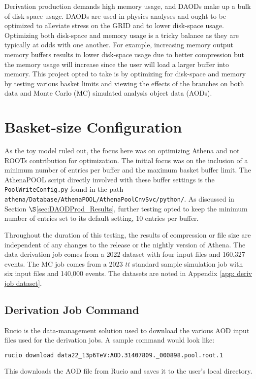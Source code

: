 Derivation production demands high memory usage, and DAODs make up a bulk of disk-space usage. 
DAODs are used in physics analyses and ought to be optimized to alleviate stress on the GRID and to lower disk-space usage. 
Optimizing both disk-space and memory usage is a tricky balance as they are typically at odds with one another. 
For example, increasing memory output memory buffers results in lower disk-space usage due to better compression but the memory usage will increase since the user will load a larger buffer into memory. 
This project opted to take is by optimizing for disk-space and memory by testing various basket limits and viewing the effects of the branches on both data and Monte Carlo (MC) simulated analysis object data (AODs).

\section{Basket-size Configuration}
\label{sec:DAODProd_Analysis}

As the toy model ruled out, the focus here was on optimizing Athena and not ROOTs contribution for optimization.
The initial focus was on the inclusion of a minimum number of entries per buffer and the maximum basket buffer limit.
The AthenaPOOL script directly involved with these buffer settings is the \verb|PoolWriteConfig.py| found in the path \verb|athena/Database/AthenaPOOL/AthenaPoolCnvSvc/python/|.
As discussed in Section $\S$\ref{sec:DAODProd_Results}, further testing opted to keep the minimum number of entries set to its default setting, 10 entries per buffer. 

Throughout the duration of this testing, the results of compression or file size are independent of any changes to the release or the nightly version of Athena.  
The data derivation job comes from a 2022 dataset with four input files and 160,327 events. 
The MC job comes from a 2023 $t\bar{t}$ standard sample simulation job with six input files and 140,000 events. 
The datasets are noted in Appendix \ref{app: deriv job dataset}.

\subsection{Derivation Job Command}
Rucio is the data-management solution used to download the various AOD input files used for the derivation jobs. 
A sample command would look like:
\begin{lstlisting}[language=bash]
    rucio download data22_13p6TeV:AOD.31407809._000898.pool.root.1
\end{lstlisting}
This downloads the AOD file from Rucio and saves it to the user's local directory.

